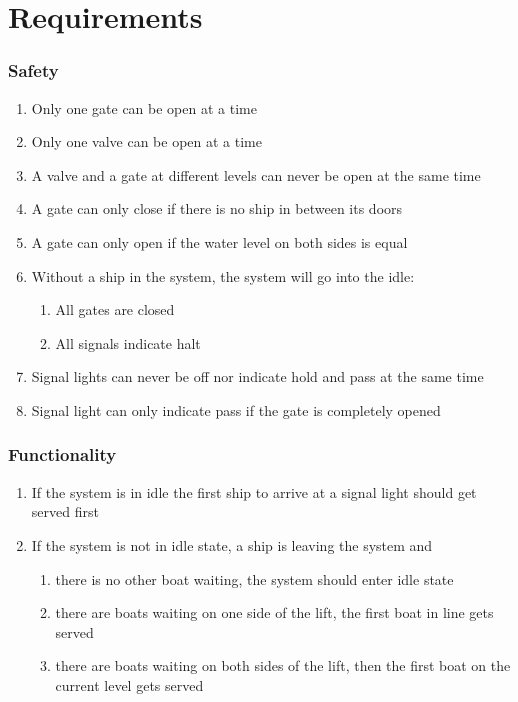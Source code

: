 \section{Requirements}
\subsubsection*{Safety}
\begin{enumerate}
	\item Only one gate can be open at a time
	\item Only one valve can be open at a time
	\item A valve and a gate at different levels can never be open at the same time
	\item A gate can only close if there is no ship in between its doors
	\item A gate can only open if the water level on both sides is equal
	\item Without a ship in the system, the system will go into the idle:
	\begin{enumerate}
		\item All gates are closed
		\item All signals indicate halt
	\end{enumerate}
	\item Signal lights can never be off nor indicate hold and pass at the same time
	\item Signal light can only indicate pass if the gate is completely opened
\end{enumerate}
	
\subsubsection*{Functionality}
\begin{enumerate}
	\item If the system is in idle the first ship to arrive at a signal light should get served first
	\item If the system is not in idle state, a ship is leaving the system and
	\begin{enumerate}
		\item there is no other boat waiting, the system should enter idle state
		\item there are boats waiting on one side of the lift, the first boat in line gets served 
		\item there are boats waiting on both sides of the lift, then the first boat on the current level gets served
	\end{enumerate}
\end{enumerate}
